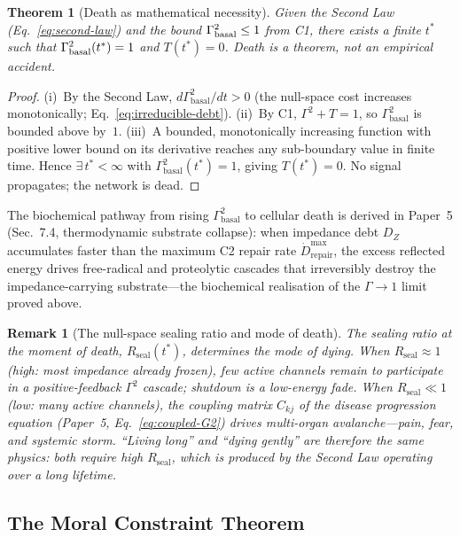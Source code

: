 \documentclass[aps,pre,twocolumn,superscriptaddress,floatfix]{revtex4-2}
\newtheorem{theorem}{Theorem}
\newtheorem{remark}{Remark}
\begin{document}
\begin{theorem}[Death as mathematical necessity]
\label{thm:death-necessity}
Given the Second Law (Eq.~\ref{eq:second-law}) and the
bound $\Gamma_{\textnormal{basal}}^2 \le 1$ from C1,
there exists a finite $t^*$ such that
$\Gamma_{\textnormal{basal}}^2(t^*) = 1$ and $T(t^*) = 0$.
Death is a theorem, not an empirical accident.
\end{theorem}

\begin{proof}
(i)~By the Second Law,
$d\Gamma_{\text{basal}}^2/dt > 0$
(the null-space cost increases monotonically;
Eq.~\ref{eq:irreducible-debt}).
(ii)~By C1, $\Gamma^2 + T = 1$, so
$\Gamma_{\text{basal}}^2$ is bounded above by~$1$.
(iii)~A bounded, monotonically increasing function with
positive lower bound on its derivative reaches any
sub-boundary value in finite time.
Hence $\exists\,t^*<\infty$ with
$\Gamma_{\text{basal}}^2(t^*) = 1$, giving $T(t^*) = 0$.
No signal propagates; the network is dead.
\end{proof}

\noindent
The biochemical pathway from rising
$\Gamma_{\text{basal}}^2$ to cellular death is derived
in Paper~5 (Sec.~7.4, thermodynamic substrate collapse):
when impedance debt $D_Z$ accumulates faster than the
maximum C2 repair rate $\dot{D}_{\text{repair}}^{\max}$,
the excess reflected energy drives free-radical and
proteolytic cascades that irreversibly destroy the
impedance-carrying substrate---the biochemical realisation
of the $\Gamma \to 1$ limit proved above.

\begin{remark}[The null-space sealing ratio and
mode of death]
\label{rem:sealing-mode}
The sealing ratio at the moment of death,
$R_{\text{seal}}(t^*)$, determines the mode of dying.
When $R_{\text{seal}}\approx 1$ (high: most impedance
already frozen), few active channels remain to participate
in a positive-feedback $\Gamma^2$ cascade; shutdown is
a low-energy fade.
When $R_{\text{seal}}\ll 1$ (low: many active channels),
the coupling matrix $C_{kj}$ of the disease progression
equation (Paper~5, Eq.~\ref{eq:coupled-G2}) drives
multi-organ avalanche---pain, fear, and systemic storm.
``Living long'' and ``dying gently'' are therefore the
same physics: both require high $R_{\text{seal}}$, which
is produced by the Second Law operating over a long
lifetime.
\end{remark}

\subsection{The Moral Constraint Theorem}
\label{sec:moral-constraint}
\end{document}
